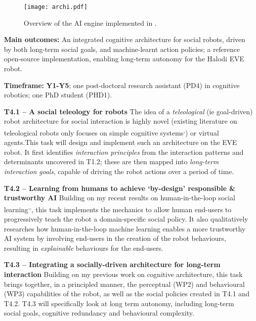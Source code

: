 \begin{figure}[h!]
\centering
\texttt{[image: archi.pdf]}
\caption{Overview of the AI engine implemented in \project.}
\label{fig:archi}
\end{figure}


\begin{oframed}
    \textbf{Main outcomes:} An integrated cognitive architecture for social
    robots, driven by both long-term social goals, and machine-learnt action
    policies; a reference open-source implementation, enabling long-term
    autonomy for the Halodi EVE robot.

    \textbf{Timeframe:} \textbf{Y1-Y5}; one post-doctoral research assistant (PD4) in cognitive
    robotics; one PhD student (PHD1).

\end{oframed}

\textbf{T4.1 -- A social teleology for robots} The idea of a \emph{teleological}
(ie goal-driven) robot architecture for social interaction is highly novel
(existing literature on teleological robots only focuses on simple cognitive
systems\textsuperscript{,})
or virtual agents.This task will design and
implement such an architecture on the EVE robot. It first identifies
\emph{interaction principles} from the interaction patterns and determinants
uncovered in T1.2; these are then mapped into \emph{long-term interaction
goals}, capable of driving the robot actions over a period of time.

\textbf{T4.2 -- Learning from humans to achieve `by-design' responsible \&
trustworthy AI} Building on my recent results on human-in-the-loop social
learning\textsuperscript{,}\textsuperscript{,},
this task implements the mechanics to allow human end-users to progressively
teach the robot a domain-specific social policy.  It also qualitatively
researches how human-in-the-loop machine learning enables a more trustworthy AI
system by involving end-users in the creation of the robot behaviours,
resulting in \emph{explainable} behaviours for the end-users.

\textbf{T4.3 -- Integrating a socially-driven architecture for long-term
interaction} Building on my previous work on cognitive
architecture, this task brings together, in
a principled manner, the perceptual (WP2) and behavioural (WP3) capabilities of
the robot, as well as the social policies created in T4.1 and T4.2. T4.3 will
specifically look at long term autonomy, including long-term social goals,
cognitive redundancy and behavioural complexity.


